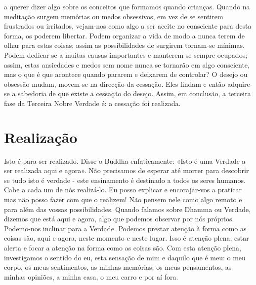 a querer dizer algo sobre os conceitos que formamos quando
crianças.
Quando na meditação surgem memórias ou medos
obsessivos, em vez de se sentirem frustrados ou irritados,
vejam-nos como algo a ser aceite no consciente para desta
forma, os poderem libertar. Podem organizar a vida de modo
a nunca terem de olhar para estas coisas; assim as possibilidades de surgirem tornam-se mínimas. Podem dedicar-se a
muitas causas importantes e manterem-se sempre ocupados;
assim, estas ansiedades e medos sem nome nunca se tornarão
em algo consciente, mas o que é que acontece quando
pararem e deixarem de controlar? O desejo ou obsessão
mudam, movem-se na direcção da cessação. Eles findam e
então adquire-se a sabedoria de que existe a cessação do desejo. Assim, em conclusão, a terceira fase da Terceira Nobre
Verdade é: a cessação foi realizada.

\section{Realização}

Isto é para ser realizado. Disse o Buddha enfaticamente:
«Isto é uma Verdade a ser realizada aqui e agora». Não precisamos de esperar até morrer para descobrir se tudo isto é
verdade - este ensinamento é destinado a todos os seres
humanos. Cabe a cada um de nós realizá-lo. Eu posso
explicar e encorajar-vos a praticar mas não posso fazer com
que o realizem!
Não pensem nele como algo remoto e para além das
vossas possibilidades. Quando falamos sobre Dhamma ou
Verdade, dizemos que está aqui e agora, algo que podemos
observar por nós próprios. Podemo-nos inclinar para a
Verdade. Podemos prestar atenção à forma como as coisas
são, aqui e agora, neste momento e neste lugar. Isso é atenção
plena, estar alerta e focar a atenção na forma como as coisas
são. Com esta atenção plena, investigamos o sentido do eu,
esta sensação de mim e daquilo que é meu: o meu corpo, os
meus sentimentos, as minhas memórias, os meus pensamentos,
as minhas opiniões, a minha casa, o meu carro e por aí fora.

